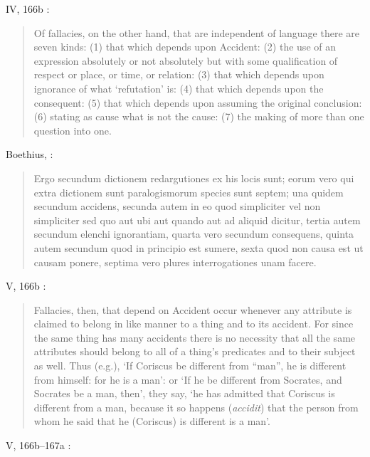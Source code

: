 \documentclass{article}
\begin{document}
IV, 166b \cite{pickard-cambridge}:
 
 \begin{quote}
Of fallacies, on the other hand, that are independent of language there are seven kinds: 
(1) that which depends upon Accident:
(2) the use of an expression absolutely or not absolutely but with some qualification of respect or place, or time, or relation: 
(3) that which depends upon ignorance of what `refutation' is: 
(4) that which depends upon the consequent: 
(5) that which depends upon assuming the original conclusion: 
(6) stating as cause what is not the cause: 
(7) the making of more than one question into one. 
 \end{quote}
 
 Boethius, \cite[pp.~10--11]{ALVI1to3}:
 
 \begin{quote}
 Ergo secundum dictionem redargutiones ex his locis sunt;
 eorum vero qui extra dictionem sunt paralogismorum species
 sunt septem; una quidem secundum accidens, secunda autem
 in eo quod simpliciter vel non simpliciter sed quo aut ubi aut
 quando aut ad aliquid dicitur, tertia autem secundum elenchi
 ignorantiam, quarta vero secundum consequens, quinta autem
 secundum quod in principio est sumere, sexta quod non causa
 est ut causam ponere, septima vero plures interrogationes
 unam facere.
 \end{quote}

V, 166b \cite{pickard-cambridge}:

\begin{quote}
Fallacies, then, that depend on Accident occur whenever any attribute is claimed to belong in like manner to a thing and to its accident. For since the same thing has many accidents there is no necessity that all the same attributes should belong to all of a thing's predicates and to their subject as well. Thus (e.g.), `If Coriscus be different from ``man'', he is different from himself: for he is a man': or `If he be different from Socrates, and Socrates be a man, then', they say, `he has admitted that Coriscus is different from a man, because it so happens
({\em accidit}) that the person from whom he said that he (Coriscus) is different is a man'. 
\end{quote}

V, 166b--167a \cite{pickard-cambridge}:
\end{document}
